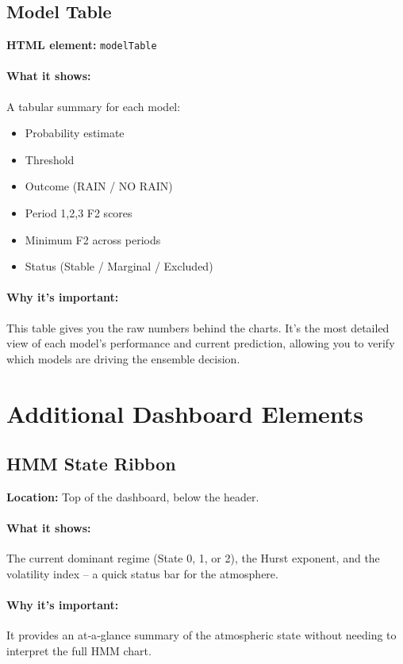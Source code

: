 \documentclass[11pt,a4paper]{article}
\begin{document}
	\subsection{Model Table}
	\textbf{HTML element:} \texttt{modelTable}
	
	\paragraph{What it shows:}
	A tabular summary for each model:
	\begin{itemize}
		\item Probability estimate
		\item Threshold
		\item Outcome (RAIN / NO RAIN)
		\item Period 1,2,3 F2 scores
		\item Minimum F2 across periods
		\item Status (Stable / Marginal / Excluded)
	\end{itemize}
	
	\paragraph{Why it’s important:}
	This table gives you the raw numbers behind the charts. It’s the most detailed view of each model’s performance and current prediction, allowing you to verify which models are driving the ensemble decision.
	
	\section{Additional Dashboard Elements}
	
	\subsection{HMM State Ribbon}
	\textbf{Location:} Top of the dashboard, below the header.
	
	\paragraph{What it shows:}
	The current dominant regime (State 0, 1, or 2), the Hurst exponent, and the volatility index – a quick status bar for the atmosphere.
	
	\paragraph{Why it’s important:}
	It provides an at‑a‑glance summary of the atmospheric state without needing to interpret the full HMM chart.
	
\end{document}
